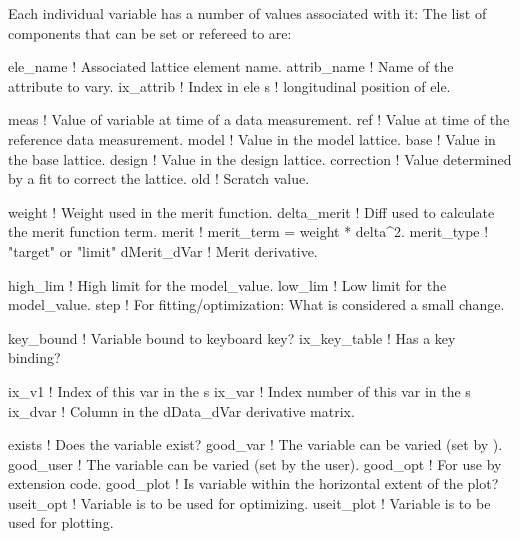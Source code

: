 Each individual variable has a number of values associated with it: The list of components that can
be set or refereed to are:
\begin{example}
  ele_name     ! Associated lattice element name.
  attrib_name  ! Name of the attribute to vary.
  ix_attrib    ! Index in ele%
  s            ! longitudinal position of ele.

  meas         ! Value of variable at time of a data measurement.
  ref          ! Value at time of the reference data measurement.
  model        ! Value in the model lattice.
  base         ! Value in the base lattice.
  design       ! Value in  the design lattice.
  correction   ! Value determined by a fit to correct the lattice.
  old          ! Scratch value.

  weight       ! Weight used in the merit function.
  delta_merit  ! Diff used to calculate the merit function term.
  merit        ! merit_term = weight * delta^2.
  merit_type   ! "target" or "limit"
  dMerit_dVar  ! Merit derivative.

  high_lim     ! High limit for the model_value.
  low_lim      ! Low limit for the model_value.
  step         ! For fitting/optimization: What is considered a small change.

  key_bound    ! Variable bound to keyboard key?
  ix_key_table ! Has a key binding?

  ix_v1        ! Index of this var in the s%
  ix_var       ! Index number of this var in the s%
  ix_dvar      ! Column in the dData_dVar derivative matrix.

  exists       ! Does the variable exist?
  good_var     ! The variable can be varied (set by \tao).
  good_user    ! The variable can be varied (set by the user).
  good_opt     ! For use by extension code.
  good_plot    ! Is variable within the horizontal extent of the plot? 
  useit_opt    ! Variable is to be used for optimizing.
  useit_plot   ! Variable is to be used for plotting.
\end{example}

